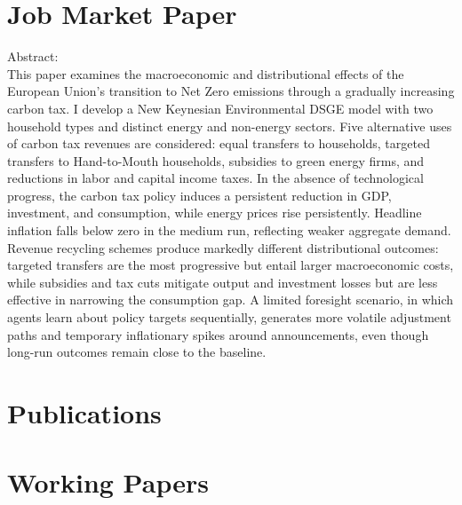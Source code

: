 \documentclass[11pt,a4paper,sans]{moderncv}
\begin{document}
\section{Job Market Paper}
Abstract:\\
This paper examines the macroeconomic and distributional effects of the European Union's transition to Net Zero emissions through a gradually increasing carbon tax. I develop a New Keynesian Environmental DSGE model with two household types and distinct energy and non-energy sectors. Five alternative uses of carbon tax revenues are considered: equal transfers to households, targeted transfers to Hand-to-Mouth households, subsidies to green energy firms, and reductions in labor and capital income taxes. In the absence of technological progress, the carbon tax policy induces a persistent reduction in GDP, investment, and consumption, while energy prices rise persistently. Headline inflation falls below zero in the medium run, reflecting weaker aggregate demand. Revenue recycling schemes produce markedly different distributional outcomes: targeted transfers are the most progressive but entail larger macroeconomic costs, while subsidies and tax cuts mitigate output and investment losses but are less effective in narrowing the consumption gap. A limited foresight scenario, in which agents learn about policy targets sequentially, generates more volatile adjustment paths and temporary inflationary spikes around announcements, even though long-run outcomes remain close to the baseline.

\section{Publications \Large{}}

\section{Working Papers}
\end{document}
